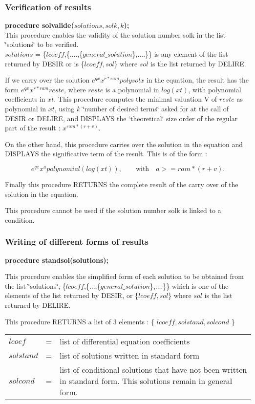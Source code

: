 \subsubsection{Verification of results}

\textbf\textbf{procedure solvalide($solutions,solk,k$);} \\
This procedure enables the validity of the solution number solk in the list
\char`\"{}solutions\char`\"{} to be verified. \\
$solutions$ = \{$lcoeff$,\{....,\{$general\_solution$\},....\}\} is any element
of the list returned by DESIR or is \{$lcoeff,sol$\} where $sol$ is the list 
returned by DELIRE. 

If we carry over the solution $e^{qx} x^{r*ram} polysolx$ in the equation, the
result has the form $e^{qx} x^{r*ram} reste$, where $reste$ is a polynomial in
$log(xt)$, with polynomial coefficients in $xt$. This procedure computes the
minimal valuation V of $reste$ as polynomial in $xt$, using $k$ \char`\"{}number
of desired terms\char`\"{} asked for at the call of DESIR or DELIRE, and DISPLAYS
the \char`\"{}theoretical\char`\"{} size order of the regular part of the result
: $x^{ram*(r+v)}$. 

On the other hand, this procedure carries over the solution in the equation
and DISPLAYS the significative term of the result. This is of the form :

\[e^{qx} x^a polynomial(log(xt)), \qquad \mbox{with} \quad a>=ram*(r+v).\]

Finally this procedure RETURNS the complete result of the carry over of the
solution in the equation. \par
This procedure cannot be used if the solution number solk is linked to a
condition.

\subsubsection{Writing of different forms of results}

\textbf{procedure standsol(solutions);} 

This procedure enables the simplified form of each solution to be obtained
from the list \char`\"{}solutions\char`\"{}, \{$lcoeff$,\{...,\{$general\_solution$\},....\}\}
which is one of the elements of the list returned by DESIR, or \{$lcoeff,sol$\} where
$sol$ is the list returned by DELIRE. \par
This procedure RETURNS a list of 3 elements : \{ $lcoeff, solstand, solcond$ \} \\
\begin{tabular}{lcp{9cm}}
$lcoef$ & = & list of differential equation coefficients \\
$solstand$ & = & list of solutions written in standard form \\
$solcond$ & = & list of conditional solutions that have not been written
              in standard form. This solutions remain in general form.
\end{tabular}


